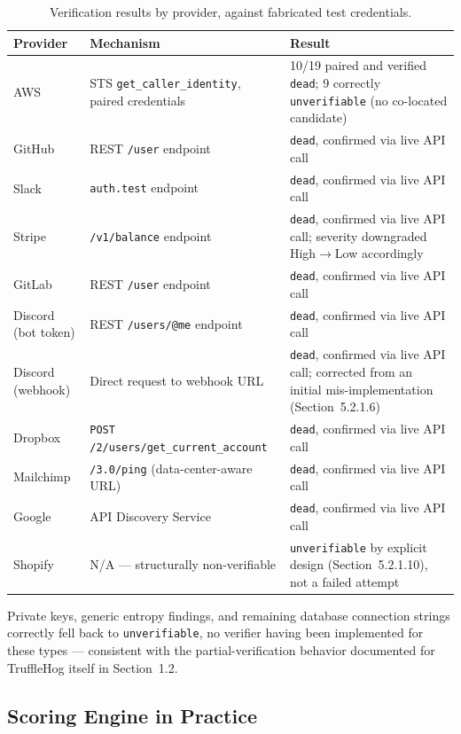 \documentclass[12pt]{article}
\begin{document}
\begin{table}[h]
\centering
\begin{tabularx}{\textwidth}{|p{}|p{}|Y|}
\hline
\textbf{Provider} & \textbf{Mechanism} & \textbf{Result} \\
\hline
AWS & STS \texttt{get\_caller\_identity}, paired credentials & 10/19 paired and verified \texttt{dead}; 9 correctly \texttt{unverifiable} (no co-located candidate) \\
GitHub & REST \texttt{/user} endpoint & \texttt{dead}, confirmed via live API call \\
Slack & \texttt{auth.test} endpoint & \texttt{dead}, confirmed via live API call \\
Stripe & \texttt{/v1/balance} endpoint & \texttt{dead}, confirmed via live API call; severity downgraded High$\to$Low accordingly \\
GitLab & REST \texttt{/user} endpoint & \texttt{dead}, confirmed via live API call \\
Discord (bot token) & REST \texttt{/users/@me} endpoint & \texttt{dead}, confirmed via live API call \\
Discord (webhook) & Direct request to webhook URL & \texttt{dead}, confirmed via live API call; corrected from an initial mis-implementation (Section~5.2.1.6) \\
Dropbox & \texttt{POST /2/users/get\_current\_account} & \texttt{dead}, confirmed via live API call \\
Mailchimp & \texttt{/3.0/ping} (data-center-aware URL) & \texttt{dead}, confirmed via live API call \\
Google & API Discovery Service & \texttt{dead}, confirmed via live API call \\
Shopify & N/A --- structurally non-verifiable & \texttt{unverifiable} by explicit design (Section~5.2.1.10), not a failed attempt \\
\hline
\end{tabularx}
\caption{Verification results by provider, against fabricated test credentials.}
\label{tab:verification-results}
\end{table}

Private keys, generic entropy findings, and remaining database connection strings correctly fell back to \texttt{unverifiable}, no verifier having been implemented for these types --- consistent with the partial-verification behavior documented for TruffleHog itself in Section~1.2.

\subsection{Scoring Engine in Practice}
\end{document}
